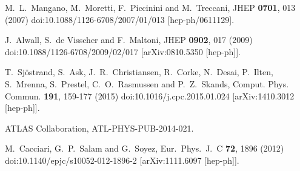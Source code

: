 \documentclass{ws-mpla}
\begin{document}
\begin{thebibliography}{99}
  M.~L.~Mangano, M.~Moretti, F.~Piccinini and M.~Treccani,
  JHEP {\bf 0701}, 013 (2007)
  doi:10.1088/1126-6708/2007/01/013
  [hep-ph/0611129].

  J.~Alwall, S.~de Visscher and F.~Maltoni,
  JHEP {\bf 0902}, 017 (2009)
  doi:10.1088/1126-6708/2009/02/017
  [arXiv:0810.5350 [hep-ph]].

  T.~Sj\"ostrand, S.~Ask, J.~R.~Christiansen, R.~Corke, N.~Desai, P.~Ilten, S.~Mrenna, S.~Prestel, C.~O.~Rasmussen and P.~Z.~Skands,
  Comput. Phys. Commun. \textbf{191}, 159-177 (2015)
  doi:10.1016/j.cpc.2015.01.024
  [arXiv:1410.3012 [hep-ph]].

  ATLAS Collaboration,
  ATL-PHYS-PUB-2014-021.

  M.~Cacciari, G.~P.~Salam and G.~Soyez,
  Eur.\ Phys.\ J.\ C {\bf 72}, 1896 (2012)
  doi:10.1140/epjc/s10052-012-1896-2
  [arXiv:1111.6097 [hep-ph]].

\end{thebibliography}
\end{document}
